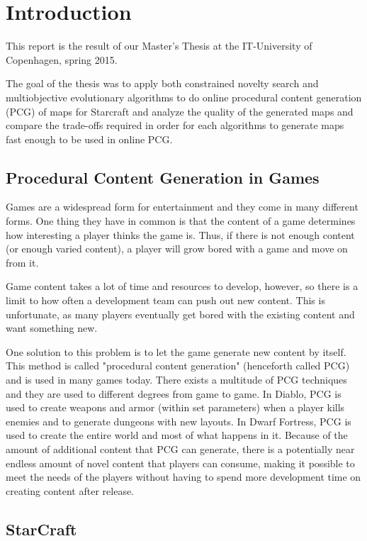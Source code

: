 \chapter{Introduction}
\label{introduction}

This report is the result of our Master's Thesis at the IT-University of Copenhagen, spring 2015.

The goal of the thesis was to apply both constrained novelty search and multiobjective evolutionary algorithms to do online procedural content generation (PCG) of maps for Starcraft and analyze the quality of the generated maps and compare the trade-offs required in order for each algorithms to generate maps fast enough to be used in online\cite{shaker2015procedural} PCG.

\section{Procedural Content Generation in Games}
\label{introdution_pcg}

Games are a widespread form for entertainment and they come in many different forms. One thing they have in common is that the content of a game determines how interesting a player thinks the game is. Thus, if there is not enough content (or enough varied content), a player will grow bored with a game and move on from it.

Game content takes a lot of time and resources to develop, however, so there is a limit to how often a development team can push out new content. This is unfortunate, as many players eventually get bored with the existing content and want something new.

One solution to this problem is to let the game generate new content by itself. This method is called "procedural content generation" (henceforth called PCG) and is used in many games today. There exists a multitude of PCG techniques and they are used to different degrees from game to game. In Diablo\cite{diablo3}, PCG is used to create weapons and armor (within set parameters) when a player kills enemies and to generate dungeons with new layouts. In Dwarf Fortress\cite{dwarffortress}, PCG is used to create the entire world and most of what happens in it. Because of the amount of additional content that PCG can generate, there is a potentially near endless amount of novel content that players can consume, making it possible to meet the needs of the players without having to spend more development time on creating content after release.
\section{StarCraft}
\label{introduction_starcraft}

